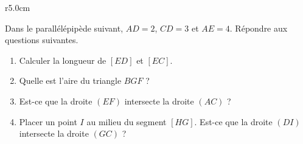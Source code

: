 
\begin{exercice}\label{exosmath-0698}

\begin{wrapfigure}{r}{5.0cm}
   \vspace{-0.5cm}        %
   \centering
   
\end{wrapfigure}

    Dans le parallélépipède suivant, \( AD=2\), \( CD=3\) et \( AE=4\). Répondre aux questions suivantes.

\begin{enumerate}
    \item
        Calculer la longueur de \(  [ED]\) et \( [EC]\).
    \item
        Quelle est l'aire du triangle \( BGF\) ?
    \item
        Est-ce que la droite \( (EF)\) intersecte la droite \( (AC)\) ?
    \item
        Placer un point \( I\) au milieu du segment \( [HG]\). Est-ce que la droite \( (DI)\) intersecte la droite \( (GC)\) ?
\end{enumerate}


\end{exercice}
